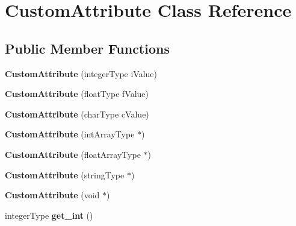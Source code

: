 \hypertarget{classCustomAttribute}{\section{Custom\-Attribute Class Reference}
\label{classCustomAttribute}
}
\subsection*{Public Member Functions}
\begin{DoxyCompactItemize}
\item 
\hypertarget{classCustomAttribute_ad3d37a3e5b13ce00d03fbd622cccb5d4}{{\bfseries Custom\-Attribute} (integer\-Type i\-Value)}\label{classCustomAttribute_ad3d37a3e5b13ce00d03fbd622cccb5d4}

\item 
\hypertarget{classCustomAttribute_a37afee2b247357805631af24e7a7ea02}{{\bfseries Custom\-Attribute} (float\-Type f\-Value)}\label{classCustomAttribute_a37afee2b247357805631af24e7a7ea02}

\item 
\hypertarget{classCustomAttribute_aceec0761aaacfd2ee0a12be5ae369c2f}{{\bfseries Custom\-Attribute} (char\-Type c\-Value)}\label{classCustomAttribute_aceec0761aaacfd2ee0a12be5ae369c2f}

\item 
\hypertarget{classCustomAttribute_a6dbc266b40a0fead26d00d685d26af1c}{{\bfseries Custom\-Attribute} (int\-Array\-Type $\ast$)}\label{classCustomAttribute_a6dbc266b40a0fead26d00d685d26af1c}

\item 
\hypertarget{classCustomAttribute_ac96a54c62526949a43d8df4604444b79}{{\bfseries Custom\-Attribute} (float\-Array\-Type $\ast$)}\label{classCustomAttribute_ac96a54c62526949a43d8df4604444b79}

\item 
\hypertarget{classCustomAttribute_a66a0371f41d446f321086dee4107f28b}{{\bfseries Custom\-Attribute} (string\-Type $\ast$)}\label{classCustomAttribute_a66a0371f41d446f321086dee4107f28b}

\item 
\hypertarget{classCustomAttribute_a9ff9390c6a6f35d01ab966db4958418a}{{\bfseries Custom\-Attribute} (void $\ast$)}\label{classCustomAttribute_a9ff9390c6a6f35d01ab966db4958418a}

\item 
\hypertarget{classCustomAttribute_a567340331c0108510ae7d79dd196e61c}{integer\-Type {\bfseries get\-\_\-int} ()}\label{classCustomAttribute_a567340331c0108510ae7d79dd196e61c}


\end{DoxyCompactItemize}
